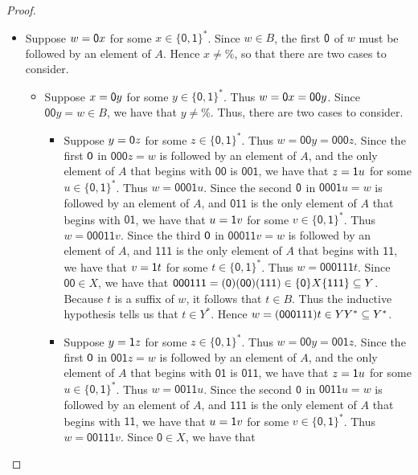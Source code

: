 \begin{proof}
\begin{itemize}
\item Suppose $w=\mathsf{0} x$ for some $x\in\mathsf{\{0,1\}}^*$.  Since
  $w\in B$, the first $\mathsf{0}$ of $w$ must be followed by an element
  of $A$.  Hence $x\neq\%$, so that there are two cases to consider.
  \begin{itemize}
  \item Suppose $x=\mathsf{0} y$ for some $y\in\mathsf{\{0,1\}}^*$.  Thus
    $w=\mathsf{0} x=\mathsf{00}y$.  Since $\mathsf{00}y=w\in B$, we have
    that $y\neq\%$.  Thus, there are two cases to consider.
    \begin{itemize}
    \item Suppose $y=\mathsf{0} z$ for some $z\in\mathsf{\{0,1\}}^*$.
      Thus $w=\mathsf{00}y=\mathsf{000}z$.  Since the first $\mathsf{0}$
      in $\mathsf{000}z=w$ is followed by an element of $A$, and the
      only element of $A$ that begins with $\mathsf{00}$ is
      $\mathsf{001}$, we have that $z=\mathsf{1} u$ for some
      $u\in\mathsf{\{0,1\}}^*$.  Thus $w=\mathsf{0001}u$.  Since the
      second $\mathsf{0}$ in $\mathsf{0001}u=w$ is followed by an element
      of $A$, and $\mathsf{011}$ is the only element of $A$ that
      begins with $\mathsf{01}$, we have that $u=\mathsf{1} v$ for some
      $v\in\mathsf{\{0,1\}}^*$.  Thus $w=\mathsf{00011}v$.  Since the
      third $\mathsf{0}$ in $\mathsf{00011}v=w$ is followed by an element
      of $A$, and $\mathsf{111}$ is the only element of $A$ that
      begins with $\mathsf{11}$, we have that $v=\mathsf{1} t$ for some
      $t\in\mathsf{\{0,1\}}^*$.  Thus $w=\mathsf{000111}t$.  Since
      $\mathsf{00}\in X$, we have that
      $\mathsf{000111}=\mathsf{(0)(00)(111)}\in\{\mathsf{0}\}X\{\mathsf{111}\}\subseteq
      Y$.  Because $t$ is a suffix of $w$, it follows that $t\in B$.
      Thus the inductive hypothesis tells us that $t\in Y^*$.  Hence
      $w=\mathsf{(000111)}t\in YY^*\subseteq Y^*$.
    \item Suppose $y=\mathsf{1} z$ for some $z\in\mathsf{\{0,1\}}^*$.
      Thus $w=\mathsf{00}y=\mathsf{001}z$.  Since the first $\mathsf{0}$
      in $\mathsf{001}z=w$ is followed by an element of $A$, and the
      only element of $A$ that begins with $\mathsf{01}$ is
      $\mathsf{011}$, we have that $z=\mathsf{1} u$ for some
      $u\in\mathsf{\{0,1\}}^*$.  Thus $w=\mathsf{0011}u$.  Since the
      second $\mathsf{0}$ in $\mathsf{0011}u=w$ is followed by an element
      of $A$, and $\mathsf{111}$ is the only element of $A$ that
      begins with $\mathsf{11}$, we have that $u=\mathsf{1} v$ for some
      $v\in\mathsf{\{0,1\}}^*$.  Thus $w=\mathsf{00111}v$.  Since
      $\mathsf{0}\in X$, we have that

\end{itemize}
\end{itemize}
\end{itemize}
\end{proof}
